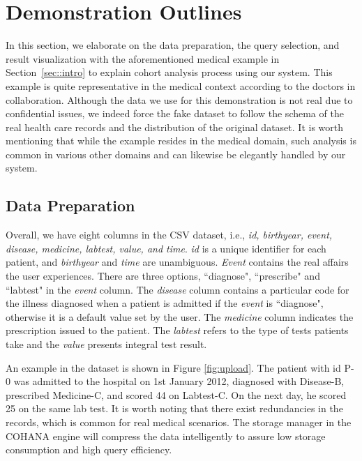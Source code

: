 \section{Demonstration Outlines}

In this section, we elaborate on the data preparation, the query selection, and result visualization with the aforementioned medical example in Section~\ref{sec::intro} to explain cohort analysis process using our system. This example is quite representative in the medical context according to the doctors in collaboration.
Although the data we use for this demonstration is not real due to confidential issues, we indeed force the fake dataset to follow the schema of the real health care records and the distribution of the original dataset.
It is worth mentioning that while the example resides in the medical domain, such analysis is common in various other domains and can likewise be elegantly handled by our system.

\subsection{Data Preparation}

Overall, we have eight columns in the CSV dataset, i.e., \emph{id, birthyear, event, disease, medicine, labtest, value, and time}. \emph{id} is a unique identifier for each patient, and \emph{birthyear} and \emph{time} are unambiguous. 
\emph{Event} contains the real affairs the user experiences.
There are three options, ``diagnose", ``prescribe" and ``labtest" in the \emph{event} column.
The \emph{disease} column contains a particular code for the illness diagnosed when a patient is admitted if the \emph{event} is ``diagnose", otherwise it is a default value set by the user.
The \emph{medicine} column indicates the prescription issued to the patient. %
The \emph{labtest} refers to the type of tests patients take and the \emph{value} presents integral test result. 

An example in the dataset is shown in Figure \ref{fig:upload}. The patient with id P-0 was admitted to the hospital on 1st January 2012, diagnosed with Disease-B, prescribed Medicine-C, and scored 44 on Labtest-C. On the next day, he scored 25 on the same lab test. 
It is worth noting that there exist redundancies in the records, which is common for real medical scenarios. 
The storage manager in the COHANA engine will compress the data intelligently to assure low storage consumption and high query efficiency.

